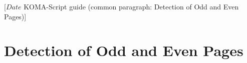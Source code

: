 %
%
%
%
%
%
%
%
% 
%
%
%
%

                 [$Date$
                  KOMA-Script guide (common paragraph: Detection of Odd and
                                     Even Pages)]


\section{Detection of Odd and Even Pages}
%
\BeginIndexGroup%
%
%

